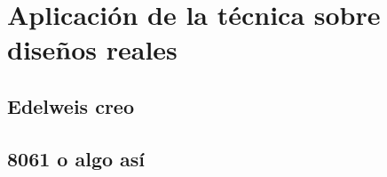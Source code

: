 \chapter{Aplicación de la técnica sobre diseños reales}
\label{ch:RealDesign}

\lettrine[lraise=-0.1, lines=2, loversize=0.2]{}{}

\section{Edelweis creo}
\label{sec:EdelweiCreo}


\section{8061 o algo así}
\label{sec:8061}


\endinput
